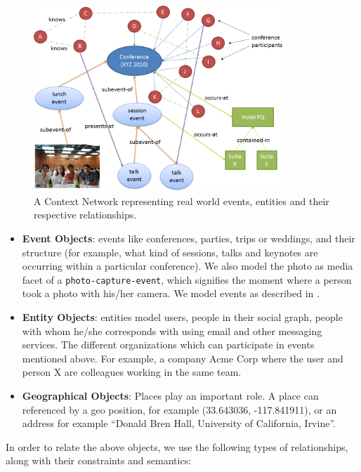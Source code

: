 \begin{figure}[h]
\centering
\includegraphics[width=0.85\textwidth]{media/chapter2/context-network-large.png}
\caption{A Context Network representing real world events, entities and their respective relationships.}
\label{fig:context-network-large}
\end{figure}

\begin{itemize}
\item \textbf{Event Objects}: events like conferences, parties, trips or weddings, and their structure (for example, what kind of sessions, talks and keynotes are occurring within a particular conference). We also model the photo as media facet of a \texttt{photo-capture-event}, which signifies the moment where a person took a photo with his/her camera. We model events as described in \cite{gupta2011managing, westermann2007toward}.

\item \textbf{Entity Objects}: entities model users, people in their social graph, people with whom he/she corresponds with using email and other messaging services. The different organizations which can participate in events mentioned above. For example, a company Acme Corp where the user and person X are colleagues working in the same team.

\item \textbf{Geographical Objects}: Places play an important role. A place can referenced by a geo position, for example (33.643036, -117.841911), or an address for example ``Donald Bren Hall, University of California, Irvine''. 
\end{itemize}

In order to relate the above objects, we use the following types of relationships, along with their constraints and semantics:

